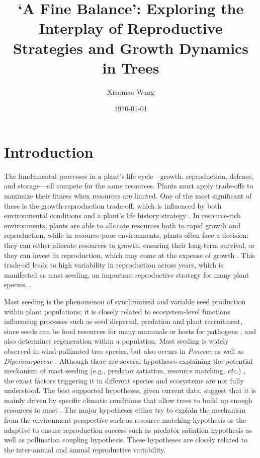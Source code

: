 \documentclass[11pt,letter]{article}
\begin{document}
\title{`A Fine Balance': Exploring the Interplay of Reproductive Strategies and Growth Dynamics in Trees}
\author{Xiaomao Wang} 
\date{\today}
\maketitle

\setlength{\parindent}{0pt}
\setlength{\parskip}{3pt}

\section{Introduction} 
The fundamental processes in a plant's life cycle—growth, reproduction, defense, and storage—all compete for the same resources. Plants must apply trade-offs to maximize their fitness when resources are limited. One of the most significant of these is the growth-reproduction trade-off, which is influenced by both environmental conditions and a plant's life history strategy \citep{grime1977evidence, stearns1998evolution}. In resource-rich environments, plants are able to allocate resources both to rapid growth and reproduction, while in resource-poor environments, plants often face a decision: they can either allocate resources to growth, ensuring their long-term survival, or they can invest in reproduction, which may come at the expense of growth \citep{bazzaz1997allocation}. This trade-off leads to high variability in reproduction across years, which is manifested as mast seeding, an important reproductive strategy for many plant species. \citep{pearse2016mechanisms}.\par
Mast seeding is the phenomenon of synchronized and variable seed production within plant populations; it is closely related to ecosystem-level functions influencing processes such as seed dispersal, predation and plant recruitment, since seeds can be food resources for many mammals or hosts for pathogens  \citep{janzen1971seed, kelly1994evolutionary, davies2024seed}, and also determines regeneration within a population. Mast seeding is widely observed in wind-pollinated tree species, but also occurs in \textit{Poaceae} as well as \textit{Diperocarpaceae} \citep{kelly2002mast}. Although there are several hypotheses explaining the potential mechanism of mast seeding (e.g., predator satiation, resource matching, \textit{etc.})  \citep{koenig2021brief}, the exact factors triggering it in different species and ecosystems are not fully understood. The best supported hypotheses, given current data, suggest that it is mainly driven by specific climatic conditions that allow trees to build up enough resources to mast  \citep{pearse2016mechanisms}. The major hypotheses either try to explain the mechanism from the environment perspective such as resource matching hypothesis or the adaptive to ensure reproduction success such as predator satiation hypothesis as well as pollination coupling hypothesis. These hypotheses are closely related to the inter-annual and annual reproductive variability.\par
\end{document}
